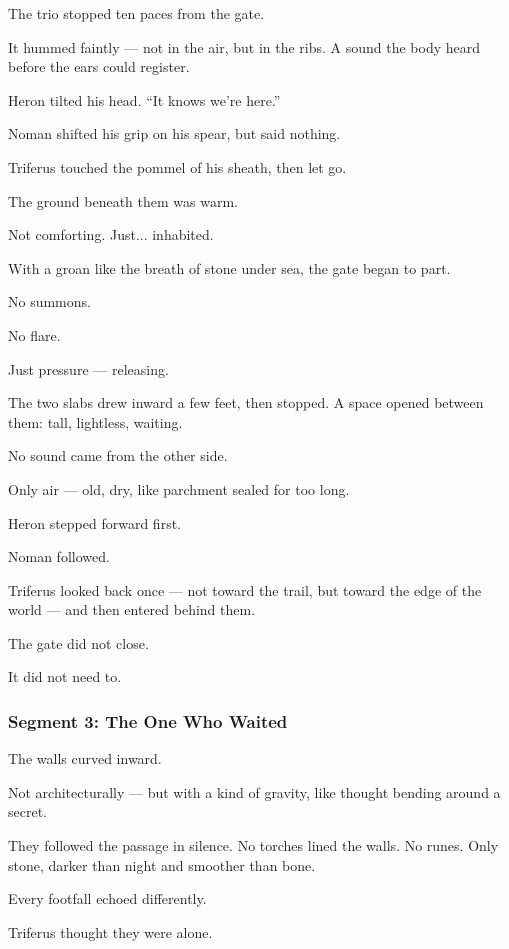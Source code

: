 \documentclass[9pt]{article}
\begin{document}
\bigskip

The trio stopped ten paces from the gate.

It hummed faintly — not in the air, but in the ribs. A sound the body heard before the ears could register.

Heron tilted his head. “It knows we’re here.”

Noman shifted his grip on his spear, but said nothing.

Triferus touched the pommel of his sheath, then let go.

The ground beneath them was warm.

Not comforting. Just... inhabited.

\bigskip

With a groan like the breath of stone under sea, the gate began to part.

No summons.

No flare.

Just pressure — releasing.

The two slabs drew inward a few feet, then stopped. A space opened between them: tall, lightless, waiting.

No sound came from the other side.

Only air — old, dry, like parchment sealed for too long.

Heron stepped forward first.

Noman followed.

Triferus looked back once — not toward the trail, but toward the edge of the world — and then entered behind them.

\bigskip

The gate did not close.

It did not need to.

\newpage

\subsubsection*{Segment 3: The One Who Waited}

The walls curved inward.

Not architecturally — but with a kind of gravity, like thought bending around a secret.

They followed the passage in silence. No torches lined the walls. No runes. Only stone, darker than night and smoother than bone.

Every footfall echoed differently.

Triferus thought they were alone.
\end{document}
